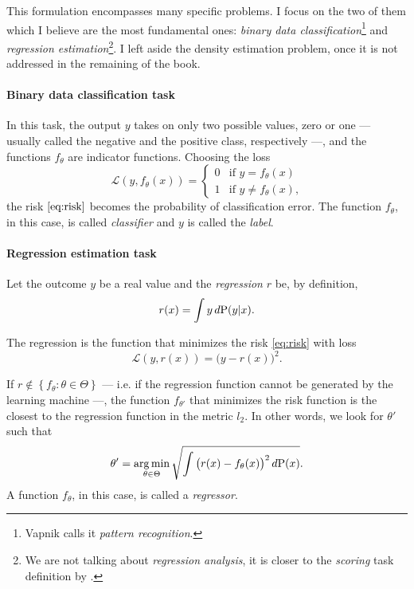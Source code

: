 This formulation encompasses many specific problems. I focus on the two of them which I
believe are the most fundamental ones: \emph{binary data classification}\footnote{Vapnik
calls it \emph{pattern recognition}.} and \emph{regression estimation}\footnote{We are not
talking about \emph{regression analysis}, it is closer to the \emph{scoring} task
definition by \textcite{Zumel2019}.}.  I left aside the density estimation problem, once
it is not
addressed in the remaining of the book.

\paragraph{Binary data classification task}  In this task, the output $y$ takes on
only two possible values, zero or one --- usually called the negative and the positive
class, respectively ---, and the functions $f_\theta$ are indicator
functions. Choosing the loss
\begin{equation*}
  \mathcal{L}(y, f_\theta(x)) = \begin{cases}
    0 & \text{if } y = f_\theta(x) \\
    1 & \text{if } y \neq f_\theta(x)\text{,}
  \end{cases}
\end{equation*}
the risk $\eqref{eq:risk}$ becomes the probability of
classification error.  The function $f_\theta$, in this case, is called \emph{classifier}
and $y$ is called the \emph{label}.

\paragraph{Regression estimation task} Let the outcome $y$ be a real value and
the \emph{regression} $r$ be, by definition, $$r(x) = \int y\, d\!\operatorname{P}(y|x) \text{.}$$

The regression is the function that minimizes the risk \eqref{eq:risk} with loss
\begin{equation*}
  \mathcal{L}(y, r(x)) = \big(y - r(x)\big)^2\text{.}
\end{equation*}

If $r \not\in \left\{ f_\theta : \theta\in\Theta \right\}$ --- i.e. if the regression function
cannot be generated by the learning machine ---, the function $f_{\theta'}$
that minimizes the risk function is the closest to the regression function in the
metric $l_2$.  In other words, we look for $\theta'$ such that
\begin{equation*}
  \theta' = \operatorname*{arg\,min}_{\theta \in \Theta} \sqrt{
    \int \big(r(x) - f_\theta(x)\big)^2\, d\!\operatorname{P}(x)
  }\text{.}
\end{equation*}
A function $f_\theta$, in this case, is called a \emph{regressor}.

